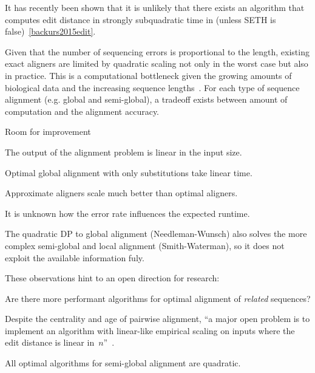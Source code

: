 It has recently been shown that it is unlikely that there exists an algorithm
that computes edit distance in strongly subquadratic time in (unless SETH is
false)~\cref{backurs2015edit}.

Given that the number of sequencing errors is proportional to the length,
existing exact aligners are limited by quadratic scaling not only in the worst
case but also in practice. This is a computational bottleneck given the growing
amounts of biological data and the increasing sequence
lengths~\citep{kucherov2019evolution}. For each type of sequence alignment (e.g.
global and semi-global), a tradeoff exists between amount of computation and the
alignment accuracy.

Room for improvement

\begin{observation}
    The output of the alignment problem is linear in the input size.
\end{observation}

\begin{observation}
    Optimal global alignment with only substitutions take linear time.
\end{observation}

\begin{observation}
    Approximate aligners scale much better than optimal aligners.
\end{observation}

It is unknown how the error rate influences the expected runtime.

\begin{observation}
    The quadratic DP to global alignment (Needleman-Wunsch) also solves the more
    complex semi-global and local alignment (Smith-Waterman), so it does not
    exploit the available information fuly.
\end{observation}

These observations hint to an open direction for research:

\begin{problem}
    Are there more performant algorithms for optimal alignment of \emph{related}
    sequences?
\end{problem}

Despite the centrality and age of pairwise alignment, ``a major open problem is
to implement an algorithm with linear-like empirical scaling on inputs where the
edit distance is linear in~$n$''~\citep{medvedev2022theoretical}.

\begin{observation}
    All optimal algorithms for semi-global alignment are quadratic.
\end{observation}

